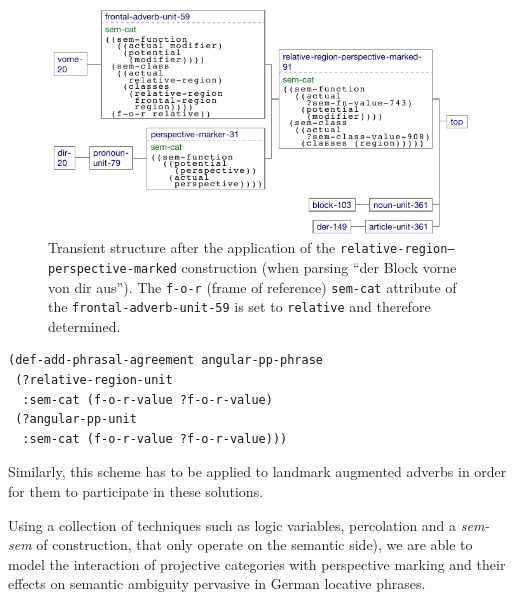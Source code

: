 \begin{figure}
\begin{center}
\includegraphics[width=0.9\columnwidth]{figs/perspective-marking-parsing-vorn-von-dir-aus-after} 
\caption[Transient structure after application]{Transient structure after the application 
of the {\footnotesize\tt relative-region--perspective-marked} construction
(when parsing ``der Block vorne von dir aus''). The {\footnotesize\tt f-o-r} (frame of reference) {\footnotesize\tt sem-cat} attribute of the 
{\footnotesize\tt frontal-adverb-unit-59} is set to {\footnotesize\tt relative} and therefore determined.}
\label{f:setting-f-o-r-after}
\end{center}
\end{figure}

\begin{example}
\label{e:def-angular-pp-phrase-agreement}
\begin{footnotesize}
\begin{Verbatim}[]
(def-add-phrasal-agreement angular-pp-phrase
 (?relative-region-unit
  :sem-cat (f-o-r-value ?f-o-r-value)
 (?angular-pp-unit
  :sem-cat (f-o-r-value ?f-o-r-value)))
\end{Verbatim}
\end{footnotesize}
\end{example}
Similarly, this scheme has to be applied to landmark augmented adverbs in order for them to participate
in these solutions.

Using a collection of techniques such as logic variables, percolation and a \emph{sem-sem} 
of construction, that only operate on the semantic side), we are able
to model the interaction of projective categories with perspective marking and their 
effects on semantic ambiguity pervasive in German locative phrases. 


